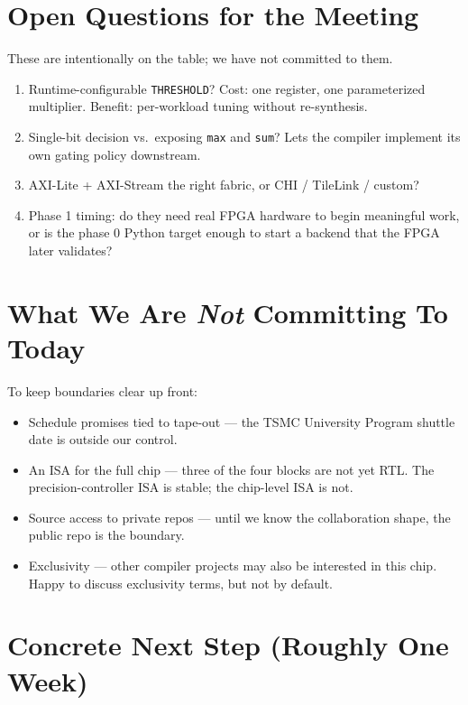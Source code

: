 \documentclass[11pt]{article}
\begin{document}
\section{Open Questions for the Meeting}
\label{sec:open}

These are intentionally on the table; we have not committed to them.

\begin{enumerate}
\item Runtime-configurable \texttt{THRESHOLD}? Cost: one register, one
  parameterized multiplier. Benefit: per-workload tuning without
  re-synthesis.
\item Single-bit decision vs.\ exposing \texttt{max} and \texttt{sum}? Lets
  the compiler implement its own gating policy downstream.
\item AXI-Lite + AXI-Stream the right fabric, or CHI / TileLink / custom?
\item Phase 1 timing: do they need real FPGA hardware to begin meaningful
  work, or is the phase 0 Python target enough to start a backend that the
  FPGA later validates?
\end{enumerate}

\section{What We Are \emph{Not} Committing To Today}
\label{sec:notcommit}

To keep boundaries clear up front:
\begin{itemize}
\item Schedule promises tied to tape-out --- the TSMC University Program
  shuttle date is outside our control.
\item An ISA for the full chip --- three of the four blocks are not yet
  RTL. The precision-controller ISA is stable; the chip-level ISA is not.
\item Source access to private repos --- until we know the collaboration
  shape, the public repo is the boundary.
\item Exclusivity --- other compiler projects may also be interested in
  this chip. Happy to discuss exclusivity terms, but not by default.
\end{itemize}

\section{Concrete Next Step (Roughly One Week)}
\label{sec:next}
\end{document}
